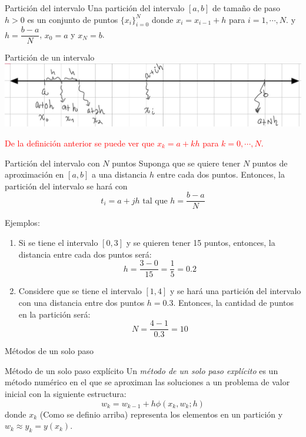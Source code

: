 \begin{frame}{Partición del intervalo}
\small
Una partición del intervalo $[a,b]$ de tamaño de paso $h>0$ es un conjunto de puntos $\{x_i\}_{i=0}^{N}$ donde $x_i=x_{i-1}+h$ para $i=1,\cdots, N.$ y $h=\dfrac{b-a}{N}$, $x_0=a$ y $x_N=b$.
\begin{block}{Partición de un intervalo}
\centering
\includegraphics[scale=0.5]{TerceraUnidad/Imagen13}
\end{block}
\textcolor{red}{
De la definición anterior se puede ver que $x_k=a+kh$ para $k=0,\cdots, N$.}
\end{frame}

\begin{frame}
\begin{block}{Partición del intervalo con $N$ puntos}
Suponga que se quiere tener $N$ puntos de aproximación en $[a, b]$ a una distancia $h$ entre cada dos puntos. Entonces, la partición del intervalo se hará  con 
$$t_i=a+jh \text{ tal que } h=\frac{b-a}{N}$$
\end{block}
Ejemplos:
\begin{enumerate}
\item Si se tiene el intervalo $[0, 3]$ y se quieren tener 15 puntos, entonces, la distancia entre cada dos puntos será:
$$h=\frac{3-0}{15}=\frac{1}{5}=0.2$$
\item Considere que se tiene el intervalo $[1, 4]$ y se hará una partición del intervalo con una distancia entre dos puntos $h=0.3$.  Entonces, la cantidad de puntos en la partición será:
$$N=\frac{4-1}{0.3}=10$$
\end{enumerate}
\end{frame}

\begin{frame}{Métodos de un solo paso}
\begin{block}{Método de un solo paso explícito}
Un \textit{método de un solo paso explícito} es un método numérico en el que se aproximan las soluciones a un problema de valor inicial con la siguiente estructura:
$$w_k=w_{k-1}+h\phi(x_k,w_k;h)$$
donde $x_k$ (Como se definio arriba) representa los elementos en un partición y $w_k\approx y_k=y(x_k)$.
\end{block}
\end{frame}

